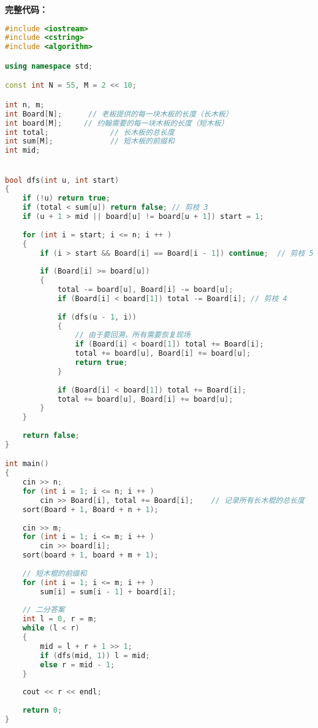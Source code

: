 \textbf{完整代码：}
\begin{lstlisting}[language=cpp]
#include <iostream>
#include <cstring>
#include <algorithm>

using namespace std;

const int N = 55, M = 2 << 10;

int n, m;
int Board[N];      // 老板提供的每一块木板的长度（长木板）
int board[M];     // 约翰需要的每一块木板的长度（短木板）
int total;              // 长木板的总长度
int sum[M];             // 短木板的前缀和
int mid;


bool dfs(int u, int start)
{
    if (!u) return true;
    if (total < sum[u]) return false; // 剪枝 3
    if (u + 1 > mid || board[u] != board[u + 1]) start = 1;
    
    for (int i = start; i <= n; i ++ )
    {
        if (i > start && Board[i] == Board[i - 1]) continue;  // 剪枝 5.2
        
        if (Board[i] >= board[u])
        {
            total -= board[u], Board[i] -= board[u];
            if (Board[i] < board[1]) total -= Board[i]; // 剪枝 4
            
            if (dfs(u - 1, i))
            {   
                // 由于要回溯，所有需要恢复现场
                if (Board[i] < board[1]) total += Board[i];
                total += board[u], Board[i] += board[u];
                return true;
            }
            
            if (Board[i] < board[1]) total += Board[i];
            total += board[u], Board[i] += board[u];
        }
    }
    
    return false;
}

int main()
{
    cin >> n; 
    for (int i = 1; i <= n; i ++ ) 
        cin >> Board[i], total += Board[i];    // 记录所有长木棍的总长度
    sort(Board + 1, Board + n + 1);
    
    cin >> m;
    for (int i = 1; i <= m; i ++ ) 
        cin >> board[i];
    sort(board + 1, board + m + 1);
    
    // 短木棍的前缀和
    for (int i = 1; i <= m; i ++ ) 
        sum[i] = sum[i - 1] + board[i];
    
    // 二分答案
    int l = 0, r = m;
    while (l < r)
    {
        mid = l + r + 1 >> 1;
        if (dfs(mid, 1)) l = mid;
        else r = mid - 1;
    }
    
    cout << r << endl;
    
    return 0;
}
\end{lstlisting}